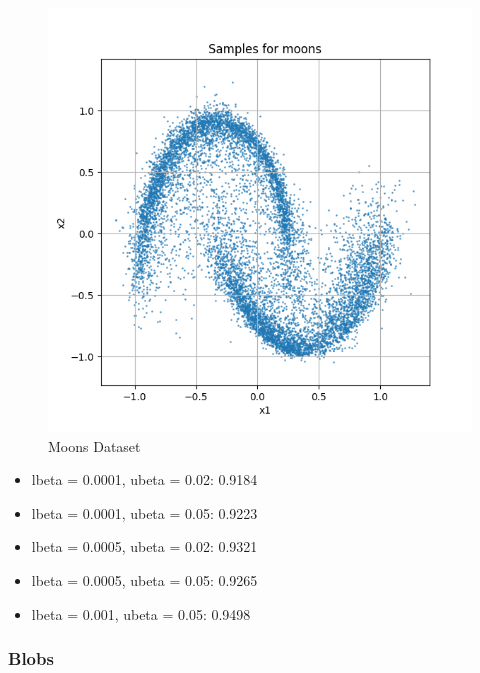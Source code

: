 \documentclass[a4paper,12pt]{article}
\begin{document}
\begin{figure}[H]
\begin{minipage}{0.3\textwidth}
  \end{minipage}
  \begin{minipage}{0.3\textwidth}
      \centering
      \includegraphics[width=\linewidth]{"images/Samples for ddpm_2_200_0.001_0.05_moons_linear.png"}
  \end{minipage}

  \caption{Moons Dataset}
\end{figure}

\begin{itemize}
  \item lbeta = 0.0001, ubeta = 0.02: 0.9184
  \item lbeta = 0.0001, ubeta = 0.05: 0.9223
  \item lbeta = 0.0005, ubeta = 0.02: 0.9321
  \item lbeta = 0.0005, ubeta = 0.05: 0.9265
  \item lbeta = 0.001, ubeta = 0.05: 0.9498
\end{itemize}

\subsubsection*{Blobs}
\end{document}
